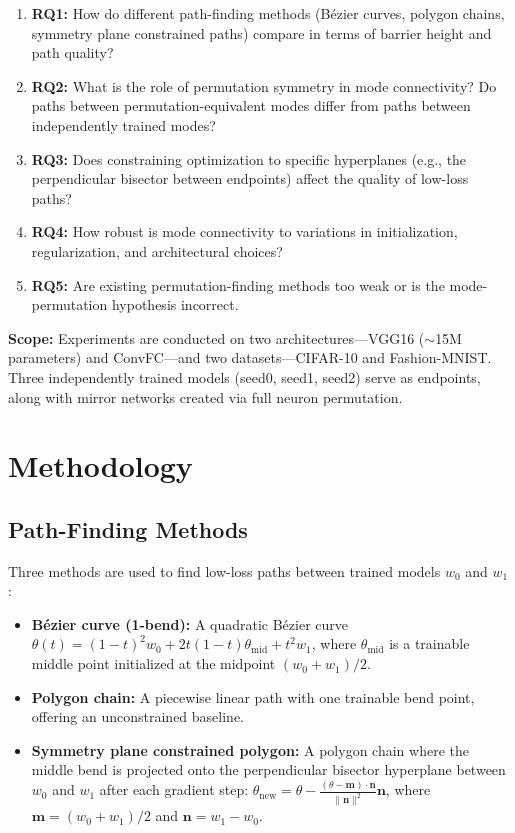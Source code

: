 \documentclass[11pt,a4paper]{article}
\begin{document}
\begin{enumerate}
    \item \textbf{RQ1:} How do different path-finding methods (B\'{e}zier curves, polygon chains, symmetry plane constrained paths) compare in terms of barrier height and path quality?
    \item \textbf{RQ2:} What is the role of permutation symmetry in mode connectivity? Do paths between permutation-equivalent modes differ from paths between independently trained modes?
    \item \textbf{RQ3:} Does constraining optimization to specific hyperplanes (e.g., the perpendicular bisector between endpoints) affect the quality of low-loss paths?
    \item \textbf{RQ4:} How robust is mode connectivity to variations in initialization, regularization, and architectural choices?
    \item \textbf{RQ5:} Are existing permutation-finding methods too weak or is the mode-permutation hypothesis incorrect.
\end{enumerate}

\textbf{Scope:} Experiments are conducted on two architectures---VGG16 ($\sim$15M parameters) and ConvFC---and two datasets---CIFAR-10 and Fashion-MNIST. Three independently trained models (seed0, seed1, seed2) serve as endpoints, along with mirror networks created via full neuron permutation.

\section{Methodology}

\subsection{Path-Finding Methods}

Three methods are used to find low-loss paths between trained models $w_0$ and $w_1$:

\begin{itemize}
    \item \textbf{B\'{e}zier curve (1-bend):} A quadratic B\'{e}zier curve $\theta(t) = (1-t)^2 w_0 + 2t(1-t)\theta_{\text{mid}} + t^2 w_1$, where $\theta_{\text{mid}}$ is a trainable middle point initialized at the midpoint $(w_0 + w_1)/2$.
    \item \textbf{Polygon chain:} A piecewise linear path with one trainable bend point, offering an unconstrained baseline.
    \item \textbf{Symmetry plane constrained polygon:} A polygon chain where the middle bend is projected onto the perpendicular bisector hyperplane between $w_0$ and $w_1$ after each gradient step: $\theta_{\text{new}} = \theta - \frac{(\theta - \mathbf{m}) \cdot \mathbf{n}}{\|\mathbf{n}\|^2} \mathbf{n}$, where $\mathbf{m} = (w_0 + w_1)/2$ and $\mathbf{n} = w_1 - w_0$.
\end{itemize}
\end{document}
